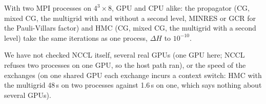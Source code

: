\documentclass[11pt,a4paper]{article}
\numberwithin{equation}{section}
\begin{document}
With two MPI processes on $4^3\times8$, GPU and CPU alike: the propagator (CG, mixed CG, the
multigrid with and without a second level, MINRES or GCR for the Pauli-Villars factor) and HMC
(CG, mixed CG, the multigrid with a second level) take the same iterations as one process,
$\Delta H$ to $10^{-10}$.

We have not checked NCCL itself, several real GPUs (one GPU here; NCCL refuses two processes on one
GPU, so the host path ran), or the speed of the exchanges (on one shared GPU each exchange incurs a
context switch: HMC with the multigrid 48\,s on two processes against 1.6\,s on one, which says
nothing about several GPUs).
\end{document}
